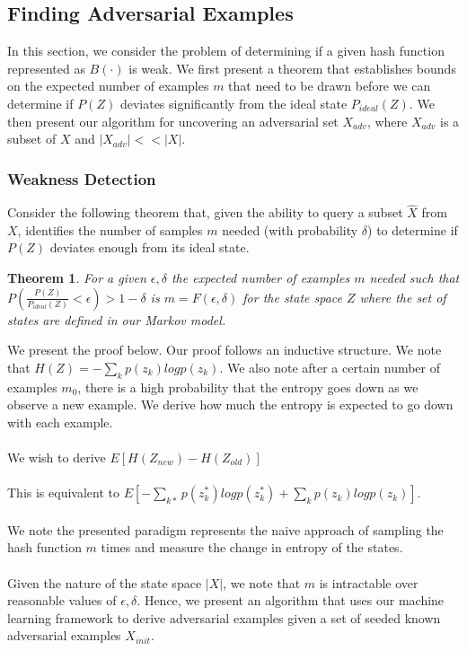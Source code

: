 \documentclass[letterpaper,twocolumn,10pt]{article}
\newtheorem{theorem}{Theorem}
\begin{document}
\subsection{Finding Adversarial Examples}
In this section, we consider the problem of determining if a given hash function represented as $B(\cdot)$ is weak. We first present a theorem that establishes bounds on the expected number of examples $m$ that need to be drawn before we can determine if $P(Z)$ deviates significantly from the ideal state $P_{ideal}(Z)$. We then present our algorithm for uncovering an adversarial set $X_{adv}$, where $X_{adv}$ is a subset of $X$ and $|X_{adv}|  << |X|$. 

\subsubsection{Weakness Detection}
Consider the following theorem that, given the ability to query a subset $\hat{X}$ from $X$, identifies the number of samples $m$ needed (with probability $\delta$) to determine if $P(Z)$ deviates enough from its ideal state. 

\begin{theorem}
\label{mainThm}
For a given $\epsilon, \delta$  the expected number of examples $m$ needed such that $P(\frac{P(Z)}{P_{ideal}(Z)}< \epsilon) > 1 - \delta$  is $m = F(\epsilon, \delta)$ for the state space $Z$ where the set of states are defined in our Markov model. 
\end{theorem}

We present the proof below. Our proof follows an inductive structure. We note that $H(Z) = -\sum_{k} p(z_{k}) log p(z_{k})$. We also note after a certain number of examples $m_{0}$, there is a high probability that the entropy goes down as we observe a new example. We derive how much the entropy is expected to go down with each example. 
\\
\\
We wish to derive $E[H(Z_{new}) - H(Z_{old})]$ 
\\
\\
This is equivalent to $E[-\sum_{k*} p(z_{k}^{*})log p(z_{k}^{*}) + \sum_{k} p(z_{k}) log p(z_{k})]$. 
\\
\\
We note the presented paradigm represents the naive approach of sampling the hash function $m$ times and measure the change in entropy of the states. 
\\
\\
Given the nature of the state space $|X|$, we note that $m$ is intractable over reasonable values of $\epsilon, \delta$. Hence, we present an algorithm that uses our machine learning framework to derive adversarial examples given a set of seeded known adversarial examples $X_{init}$. 
\end{document}
